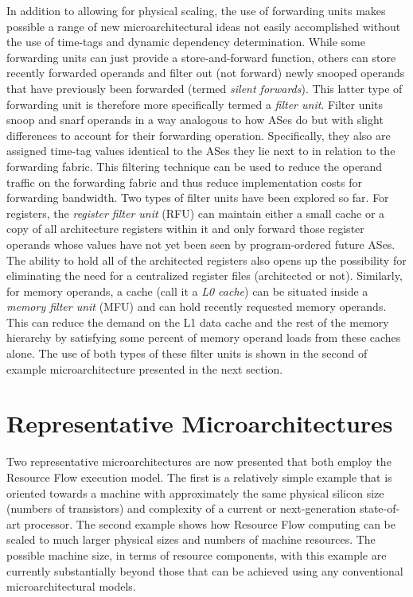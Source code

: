 \documentclass{book}
\begin{document}
In addition to allowing for physical scaling, the
use of forwarding units 
makes possible a range of new microarchitectural
ideas not easily accomplished without the use of time-tags
and dynamic dependency determination.
While some forwarding units
can just provide a store-and-forward function, others
can store recently forwarded operands
and filter out (not forward) newly snooped operands 
that have previously been forwarded (termed \textit{silent forwards}).
This latter type of forwarding unit is therefore more specifically
termed a \textit{filter unit}.
Filter units snoop and snarf operands in a way 
analogous to how ASes do but with slight differences to account
for their forwarding operation.  Specifically, they also
are assigned time-tag values identical to the ASes they
lie next to in relation to the forwarding fabric.
This filtering technique can be used to reduce the operand traffic
on the forwarding fabric and thus reduce implementation costs
for forwarding bandwidth.
Two types of filter units have been explored so far.
For registers, the \textit{register filter unit} (RFU) can maintain
either a small cache or a copy of all architecture registers
within it and only forward those register operands whose values
have not yet been seen by program-ordered future ASes.
The ability to hold all of the architected registers also
opens up the possibility for eliminating the need for a
centralized register files (architected or not).
Similarly, for memory operands, a cache (call it a \textit{L0 cache})
can be situated inside a \textit{memory filter unit} (MFU)
and can hold recently requested memory operands.
This can reduce the demand on the L1 data cache and the rest
of the memory hierarchy by satisfying some percent of memory
operand loads from these caches alone.
The use of both types of these filter units is shown in
the second of example microarchitecture presented in the
next section.
%
%
\section{Representative Microarchitectures}
%
Two representative microarchitectures are now presented that both
employ the Resource Flow execution model.
The first is a relatively simple example that is oriented
towards a machine with approximately the same physical silicon size
(numbers of transistors) and complexity of a current or next-generation
state-of-art
processor.
The second example shows how Resource Flow computing can be
scaled to much larger physical sizes and numbers of machine
resources.  The possible machine size, in terms of resource components,
with this example are currently
substantially beyond those that can be achieved using any
conventional microarchitectural models.
\end{document}
